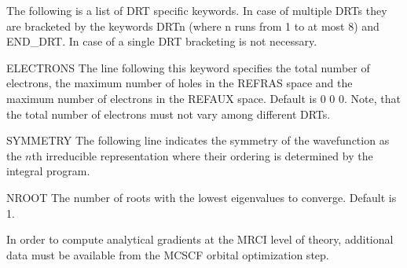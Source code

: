 The following is a list of DRT specific keywords. In case of multiple DRTs
they are bracketed by the keywords DRTn (where n runs from 1 to at most 8)
and END\_DRT. In case of a single DRT bracketing is not necessary. 
\begin{keywordlist}
\item[ELECTRONS]
The line following this keyword specifies the total number of electrons,
the maximum number of holes in the REFRAS space and the maximum number 
of electrons in the REFAUX space. Default is 0 0 0. Note, that the total
number of electrons must not vary among different DRTs.
\item[SYMMETRY]
The following line indicates the symmetry of the wavefunction as 
the $n$th irreducible representation where their ordering is determined by
the   integral program.
\item[NROOT]
The number of roots with the lowest eigenvalues to converge. Default is 1.
\end{keywordlist}

In order to compute analytical gradients at the MRCI level of theory, 
additional data must be available from the MCSCF orbital optimization 
step. 

